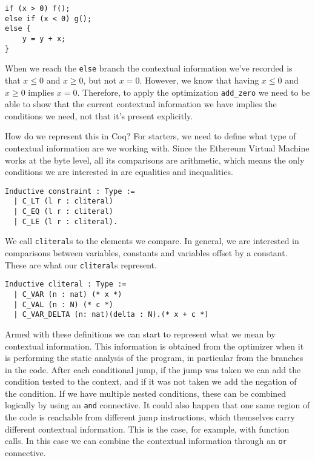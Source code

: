 \begin{verbatim}
if (x > 0) f();
else if (x < 0) g();
else {
    y = y + x;
}
\end{verbatim}

When we reach the \texttt{else} branch the contextual information we've recorded is that 
$x \le 0$ and $x \ge 0$, but not $x = 0$. However, we know that having $x \le 0$ and $x \ge 0$ implies 
$x = 0$. Therefore, to apply the optimization \texttt{add_zero} we need to be able to show 
that the current contextual information we have implies the conditions we need, not that it's present
explicitly.

How do we represent this in Coq? For starters, we need to define what type of contextual information
are we working with. Since the Ethereum Virtual Machine works at the byte level, all its comparisons
are arithmetic, which means the only conditions we are interested in are equalities and inequalities.

\begin{verbatim}
Inductive constraint : Type :=
  | C_LT (l r : cliteral)
  | C_EQ (l r : cliteral)
  | C_LE (l r : cliteral).
\end{verbatim}

We call \texttt{cliteral}s to the elements we compare. In general, we are interested in 
comparisons between variables, constants and variables offset by a constant. These are what our 
\texttt{cliteral}s represent.

\begin{verbatim}
Inductive cliteral : Type :=
  | C_VAR (n : nat) (* x *)
  | C_VAL (n : N) (* c *)
  | C_VAR_DELTA (n: nat)(delta : N).(* x + c *)
\end{verbatim}

Armed with these definitions we can start to represent what we mean by contextual information. This 
information is obtained from the optimizer when it is performing the static analysis of the program, 
in particular from the branches in the code. After each conditional jump, if the jump was taken we 
can add the condition tested to the context, and if it was not taken we add the negation of the 
condition. If we have multiple nested conditions, these can be combined logically by using an 
\texttt{and} connective. It could also happen that one same region of the code is reachable 
from different jump instructions, which themselves carry different contextual information. This is the 
case, for example, with function calls. In this case we can combine the contextual information through 
an \texttt{or} connective. 

